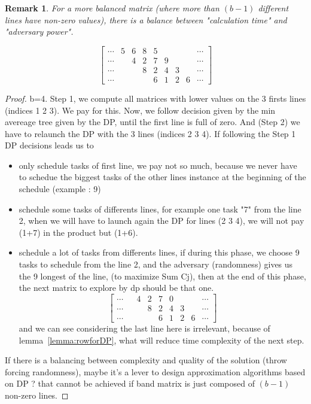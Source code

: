 \documentclass{article}
\newtheorem{remark}{Remark}
\begin{document}
\begin{remark}For a more balanced matrix (where more than $(b-1)$ different lines have non-zero values), there is a balance between "calculation time" and "adversary power".

\[\begin{bmatrix}  
\cdots & 5 & 6 & 8 & 5 &  &  & &\cdots \\  
\cdots &  & 4 & 2 & 7 & 9 &  & &\cdots  \\ 
\cdots &  &    & 8 & 2 & 4 & 3 & &\cdots  \\   
\cdots &  &    &    & 6 & 1 & 2 & 6& \cdots 
\end{bmatrix}  \]
\end{remark}\begin{proof}
b=4. Step 1, we compute all matrices with lower values on the 3 firsts lines (indices 1 2 3). We pay for this. Now, we follow decision given by the min avereage tree given by the DP, until the first line is full of zero. And (Step 2) we have to relaunch the DP with the 3 lines (indices 2 3 4). If following the Step 1 DP decisions leads us to\begin{itemize}
\item only schedule tasks of first line, we pay not so much, because we never have to schedue the biggest tasks of the other lines instance at the beginning of the schedule (example : 9)
\item schedule some tasks of differents lines, for example one task "7" from the line 2, when we will have to launch again the DP for lines (2 3 4), we will not pay (1+7) in the product but (1+6).
\item schedule a lot of tasks from differents lines, if during this phase, we choose 9 tasks to schedule from the line 2, and the adversary (randomness) gives us the 9 longest of the line, (to maximize Sum Cj), then at the end of this phase, the next matrix to explore by dp should be that one.
\[\begin{bmatrix}  
\cdots &  & 4 & 2 & 7 & 0 &  & &\cdots  \\ 
\cdots &  &    & 8 & 2 & 4 & 3 & &\cdots  \\   
\cdots &  &    &    & 6 & 1 & 2 & 6& \cdots 
\end{bmatrix}  \]
and we can see considering the last line here is irrelevant, because of lemma~\ref{lemma:rowforDP}, what will reduce time complexity of the next step.
\end{itemize}
If there is a balancing between complexity and quality of the solution (throw forcing randomness), maybe it's a lever to design approximation algorithms based on DP ? that cannot be achieved if band matrix is just composed of $(b-1)$ non-zero lines.  \end{proof}



\end{document}

